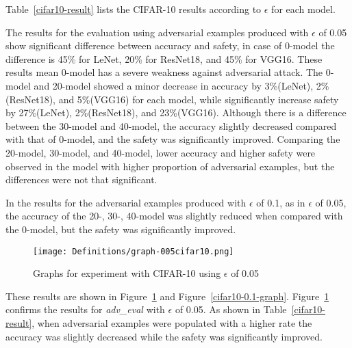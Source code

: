 \documentclass[symmetry,article,submit,moreauthors,pdftex]{Definitions/mdpi}
\begin{document}
Table~\ref{cifar10-result} lists the CIFAR-10 results according to \begin{math}\epsilon\end{math} for each model.

The results for the evaluation using adversarial examples produced with \begin{math}\epsilon\end{math} of 0.05 show significant difference between accuracy and safety, in case of 0-model the difference is 45\%  for LeNet, 20\% for ResNet18, and 45\% for VGG16. These results mean 0-model has a severe weakness  against adversarial attack.
The 0-model and 20-model showed a minor decrease in accuracy by 3\%(LeNet), 2\%(ResNet18), and 5\%(VGG16) for each model, while significantly increase safety by 27\%(LeNet), 2\%(ResNet18), and 23\%(VGG16).
Although there is a difference between the 30-model and 40-model, the accuracy slightly decreased compared with that of 0-model, and the safety was significantly improved.
Comparing the 20-model, 30-model, and 40-model, lower accuracy and higher safety were observed in the model with higher proportion of adversarial examples, but the differences were not that significant.

In the results for the adversarial examples produced with \begin{math}\epsilon\end{math} of 0.1, as in \begin{math}\epsilon\end{math} of 0.05, the accuracy of the 20-, 30-, 40-model was slightly reduced when compared with the 0-model, but the safety was significantly improved.

\begin{figure}[H]
    \texttt{[image: Definitions/graph-005cifar10.png]}
    \caption{Graphs for experiment with CIFAR-10 using \begin{math}\epsilon\end{math} of 0.05\label{cifar10-0.05-graph}}
\end{figure}

These results are shown in Figure~\ref{cifar10-0.05-graph} and Figure~\ref{cifar10-0.1-graph}.
Figure~\ref{cifar10-0.05-graph} confirms the results for {\it adv\_eval} with \begin{math}\epsilon\end{math} of 0.05.
As shown in Table~\ref{cifar10-result}, when adversarial examples were populated with a higher rate the accuracy was slightly decreased while the safety was significantly improved.
\end{document}
